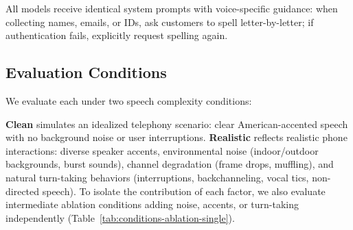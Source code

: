 \begin{table}[h]
\caption{Audio-native models evaluated.}
\label{tab:models}
\centering
\begin{small}
\end{small}
\end{table}

All models receive identical system prompts with voice-specific guidance: when collecting names, emails, or IDs, ask customers to spell letter-by-letter; if authentication fails, explicitly request spelling again.

\subsection{Evaluation Conditions}

We evaluate each  under two speech complexity conditions:



\textbf{Clean} simulates an idealized telephony scenario: clear American-accented speech with no background noise or user interruptions. \textbf{Realistic} reflects realistic phone interactions: diverse speaker accents, environmental noise (indoor/outdoor backgrounds, burst sounds), channel degradation (frame drops, muffling), and natural turn-taking behaviors (interruptions, backchanneling, vocal tics, non-directed speech). To isolate the contribution of each factor, we also evaluate intermediate ablation conditions adding noise, accents, or turn-taking independently (Table~\ref{tab:conditions-ablation-single}).



